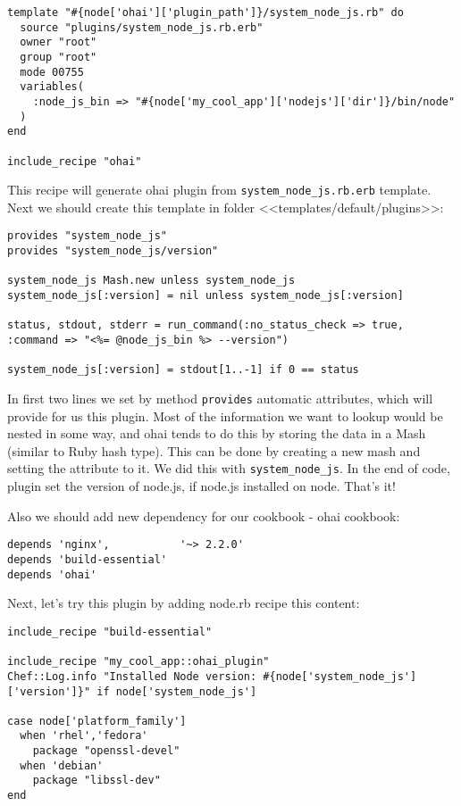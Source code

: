 \begin{lstlisting}[label=lst:cookbook-ohai-recipe1,title=my-server-cloud/site-cookbooks/my\_cool\_app/recipe/ohai\_plugin.rb]
template "#{node['ohai']['plugin_path']}/system_node_js.rb" do
  source "plugins/system_node_js.rb.erb"
  owner "root"
  group "root"
  mode 00755
  variables(
    :node_js_bin => "#{node['my_cool_app']['nodejs']['dir']}/bin/node"
  )
end

include_recipe "ohai"
\end{lstlisting}

This recipe will generate ohai plugin from \lstinline!system_node_js.rb.erb! template. Next we should create this template in folder <<templates/default/plugins>>:

\begin{lstlisting}[label=lst:cookbook-ohai-template1,title=my-server-cloud/site-cookbooks/my\_cool\_app/templates/default/plugin/system\_node\_js.rb.erb]
provides "system_node_js"
provides "system_node_js/version"

system_node_js Mash.new unless system_node_js
system_node_js[:version] = nil unless system_node_js[:version]

status, stdout, stderr = run_command(:no_status_check => true, :command => "<%= @node_js_bin %> --version")

system_node_js[:version] = stdout[1..-1] if 0 == status
\end{lstlisting}

In first two lines we set by method \lstinline!provides! automatic attributes, which will provide for us this plugin.
Most of the information we want to lookup would be nested in some way, and ohai tends to do this by storing the data in a Mash (similar to Ruby hash type). This can be done by creating a new mash and setting the attribute to it. We did this with \lstinline!system_node_js!. In the end of code, plugin set the version of node.js, if node.js installed on node. That's it!

Also we should add new dependency for our cookbook - ohai cookbook:

\begin{lstlisting}[label=lst:cookbook-ohai5]
depends 'nginx',           '~> 2.2.0'
depends 'build-essential'
depends 'ohai'
\end{lstlisting}

Next, let's try this plugin by adding node.rb recipe this content:

\begin{lstlisting}[label=lst:cookbook-ohai6]
include_recipe "build-essential"

include_recipe "my_cool_app::ohai_plugin"
Chef::Log.info "Installed Node version: #{node['system_node_js']['version']}" if node['system_node_js']

case node['platform_family']
  when 'rhel','fedora'
    package "openssl-devel"
  when 'debian'
    package "libssl-dev"
end
\end{lstlisting}

